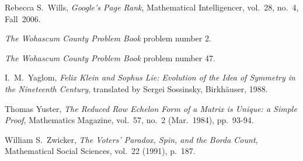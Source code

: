 \begin{thebibliography}{\makebox[2em][c]{{}\hfil{}}}
  Rebecca S.~Wills,
  \emph{Google's Page Rank},
  Mathematical Intelligencer,
  vol.~28, no.~4, Fall~2006.

  \emph{The Wohascum County Problem Book}
  problem number 2.

  \emph{The Wohascum County Problem Book}
  problem number 47.

  I.\ M.~Yaglom,
  \emph{Felix Klein and Sophus Lie: Evolution of the Idea of
   Symmetry in the Nineteenth Century},
  translated by Sergei Sossinsky,
  Birkh\"auser,
  1988.

  Thomas Yuster,
  \emph{The Reduced Row Echelon Form of a Matrix is Unique: a Simple Proof},
  Mathematics Magazine,
  vol.~57, no.~2 (Mar.~1984),
  pp.~93-94.

  William S.~Zwicker,
  \emph{The Voters' Paradox, Spin, and the Borda Count},
  Mathematical Social Sciences,
  vol.~22 (1991),
  p.~187. 

\end{thebibliography}

